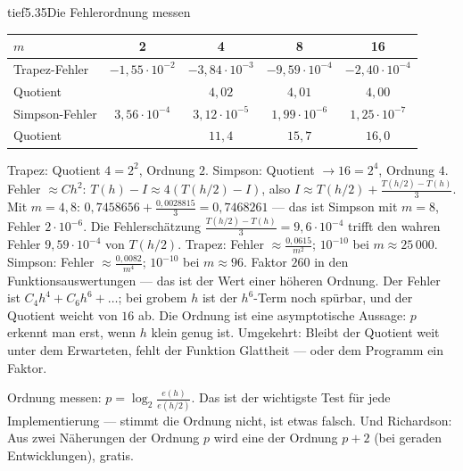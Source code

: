 \begin{loesungkarte}{tief}{5.35}{Die Fehlerordnung messen}
\begin{center}\footnotesize\setlength{\tabcolsep}{4pt}
\begin{tabular}{l|cccc}
$m$ & 2 & 4 & 8 & 16\\ \hline
Trapez-Fehler & $-1{,}55\cdot10^{-2}$ & $-3{,}84\cdot10^{-3}$ & $-9{,}59\cdot10^{-4}$ & $-2{,}40\cdot10^{-4}$\\
Quotient & & $4{,}02$ & $4{,}01$ & $4{,}00$\\ \hline
Simpson-Fehler & $3{,}56\cdot10^{-4}$ & $3{,}12\cdot10^{-5}$ & $1{,}99\cdot10^{-6}$ & $1{,}25\cdot10^{-7}$\\
Quotient & & $11{,}4$ & $15{,}7$ & $16{,}0$
\end{tabular}
\end{center}
Trapez: Quotient $4 = 2^{2}$, Ordnung $2$. Simpson: Quotient $\to16 = 2^{4}$, Ordnung $4$.
Fehler $\approx Ch^{2}$: $T(h) - I\approx4(T(h/2) - I)$, also $I\approx T(h/2) + \frac{T(h/2) - T(h)}3$. Mit $m = 4, 8$: $0{,}7458656 + \frac{0{,}0028815}3 = 0{,}7468261$ --- das ist Simpson mit $m = 8$, Fehler $2\cdot10^{-6}$. Die Fehlerschätzung $\frac{T(h/2) - T(h)}3 = 9{,}6\cdot10^{-4}$ trifft den wahren Fehler $9{,}59\cdot10^{-4}$ von $T(h/2)$.
Trapez: Fehler $\approx\frac{0{,}0615}{m^{2}}$; $10^{-10}$ bei $m\approx25\,000$. Simpson: Fehler $\approx\frac{0{,}0082}{m^{4}}$; $10^{-10}$ bei $m\approx96$. Faktor $260$ in den Funktionsauswertungen --- das ist der Wert einer höheren Ordnung.
Der Fehler ist $C_4h^{4} + C_6h^{6} + \dots$; bei grobem $h$ ist der $h^{6}$-Term noch spürbar, und der Quotient weicht von $16$ ab. Die Ordnung ist eine asymptotische Aussage: $p$ erkennt man erst, wenn $h$ klein genug ist. Umgekehrt: Bleibt der Quotient weit unter dem Erwarteten, fehlt der Funktion Glattheit --- oder dem Programm ein Faktor.
\begin{mitnehmen}\kastentext
Ordnung messen: $p = \log_2\frac{e(h)}{e(h/2)}$. Das ist der wichtigste Test für jede Implementierung --- stimmt die Ordnung nicht, ist etwas falsch. Und Richardson: Aus zwei Näherungen der Ordnung $p$ wird eine der Ordnung $p + 2$ (bei geraden Entwicklungen), gratis.
\end{mitnehmen}
\end{loesungkarte}

